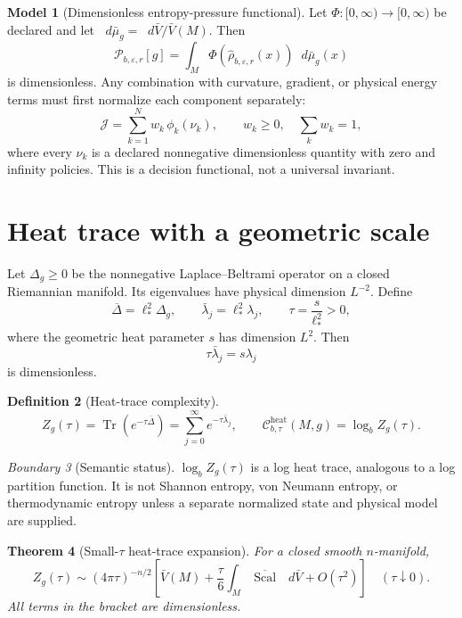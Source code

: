 \documentclass[11pt,a4paper]{article}
\theoremstyle{definition}
\newtheorem{definition}{Definition}[section]
\newtheorem{model}[definition]{Model}
\theoremstyle{plain}
\newtheorem{theorem}[definition]{Theorem}
\theoremstyle{remark}
\newtheorem{warning}[definition]{Boundary}
\newcommand{\Ccal}{\mathcal{C}}
\newcommand{\dd}{\mathop{}\!d}
\newcommand{\Scal}{\operatorname{Scal}}
\newcommand{\Tr}{\operatorname{Tr}}
\begin{document}
\begin{model}[Dimensionless entropy-pressure functional]
Let $\Phi:[0,\infty)\to[0,\infty)$ be declared and let
$\dd\bar\mu_g=\dd\bar V/\bar V(M)$. Then
\[
\mathcal{P}_{b,\varepsilon,r}[g]
=
\int_M
\Phi\!\left(\widehat\rho_{b,\varepsilon,r}(x)\right)
\dd\bar\mu_g(x)
\]
is dimensionless. Any combination with curvature, gradient, or physical
energy terms must first normalize each component separately:
\[
\mathcal{J}
=
\sum_{k=1}^Nw_k\,\phi_k(\nu_k),
\qquad
w_k\geq0,\quad\sum_kw_k=1,
\]
where every $\nu_k$ is a declared nonnegative dimensionless quantity with
zero and infinity policies. This is a decision functional, not a universal
invariant.
\end{model}

\section{Heat trace with a geometric scale}

Let $\Delta_g\geq0$ be the nonnegative Laplace--Beltrami operator on a
closed Riemannian manifold. Its eigenvalues have physical dimension
$L^{-2}$. Define
\[
\overline\Delta=\ell_*^2\Delta_g,
\qquad
\bar\lambda_j=\ell_*^2\lambda_j,
\qquad
\tau=\frac{s}{\ell_*^2}>0,
\]
where the geometric heat parameter $s$ has dimension $L^2$. Then
\[
\tau\bar\lambda_j=s\lambda_j
\]
is dimensionless.

\begin{definition}[Heat-trace complexity]
\[
Z_g(\tau)
=
\Tr(e^{-\tau\overline\Delta})
=
\sum_{j=0}^{\infty}e^{-\tau\bar\lambda_j},
\qquad
\Ccal^{\mathrm{heat}}_{b,\tau}(M,g)
=
\log_bZ_g(\tau).
\]
\end{definition}

\begin{warning}[Semantic status]
$\log_bZ_g(\tau)$ is a log heat trace, analogous to a log partition
function. It is not Shannon entropy, von Neumann entropy, or thermodynamic
entropy unless a separate normalized state and physical model are supplied.
\end{warning}

\begin{theorem}[Small-$\tau$ heat-trace expansion]
\label{thm:heat}
For a closed smooth $n$-manifold,
\[
Z_g(\tau)
\sim
(4\pi\tau)^{-n/2}
\left[
\bar V(M)
+\frac{\tau}{6}
\int_M\overline{\Scal}\,\dd\bar V
+O(\tau^2)
\right]
\quad
(\tau\downarrow0).
\]
All terms in the bracket are dimensionless.
\end{theorem}
\end{document}
